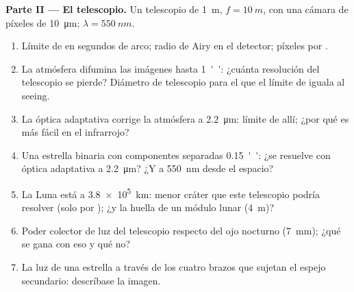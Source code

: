 \begin{problem}
\medskip
\noindent\textbf{Parte II --- El telescopio.}
Un telescopio de \qty{1}{m}, $f = \qty{10}{m}$, con una cámara de píxeles de \qty{10}{\micro m};
$\lambda = \qty{550}{nm}$.
\begin{enumerate}[resume]
  \item Límite de  en segundos de arco; radio de Airy en el
        detector; píxeles por .
  \item La atmósfera difumina las imágenes hasta \qty{1}{''}: ¿cuánta
        resolución del telescopio se pierde? Diámetro de telescopio para el que
        el límite de  iguala al seeing.
  \item La óptica adaptativa corrige la atmósfera a \qty{2.2}{\micro m}:
        límite de  allí; ¿por qué es más fácil en el infrarrojo?
  \item Una estrella binaria con componentes separadas \qty{0.15}{''}: ¿se resuelve con
        óptica adaptativa a \qty{2.2}{\micro m}? ¿Y a \qty{550}{nm} desde el espacio?
  \item La Luna está a \qty{3.8e5}{km}: menor cráter que este telescopio
        podría resolver (solo por ); ¿y la huella de un módulo
        lunar (\qty{4}{m})?
  \item Poder colector de luz del telescopio respecto del
        ojo nocturno (\qty{7}{mm}); ¿qué se gana con eso y qué no?
  \item La luz de una estrella a través de los cuatro brazos que sujetan el
        espejo secundario: descríbase la imagen.
\end{enumerate}


\end{problem}
